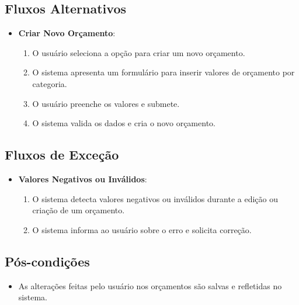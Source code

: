 \subsection*{Fluxos Alternativos}
\begin{addmargin}[1.5cm]{0cm}
	\begin{itemize}
		\item \textbf{Criar Novo Orçamento}:
		      \begin{enumerate}
			      \item O usuário seleciona a opção para criar um novo orçamento.
			      \item O sistema apresenta um formulário para inserir valores de orçamento por categoria.
			      \item O usuário preenche os valores e submete.
			      \item O sistema valida os dados e cria o novo orçamento.
		      \end{enumerate}
	\end{itemize}
\end{addmargin}

\subsection*{Fluxos de Exceção}
\begin{addmargin}[1.5cm]{0cm}
	\begin{itemize}
		\item \textbf{Valores Negativos ou Inválidos}:
		      \begin{enumerate}
			      \item O sistema detecta valores negativos ou inválidos durante a edição ou criação de um orçamento.
			      \item O sistema informa ao usuário sobre o erro e solicita correção.
		      \end{enumerate}
	\end{itemize}
\end{addmargin}

\subsection*{Pós-condições}
\begin{addmargin}[1.5cm]{0cm}
	\begin{itemize}
		\item As alterações feitas pelo usuário nos orçamentos são salvas e refletidas no sistema.
	\end{itemize}
\end{addmargin}

